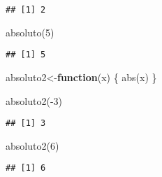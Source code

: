 \documentclass[
]{article}
\newenvironment{Shaded}{\begin{snugshade}}{\end{snugshade}}
\newcommand{\ControlFlowTok}[1]{\textcolor[rgb]{0.13,0.29,0.53}{\textbf{#1}}}
\newcommand{\DecValTok}[1]{\textcolor[rgb]{0.00,0.00,0.81}{#1}}
\newcommand{\FunctionTok}[1]{\textcolor[rgb]{0.00,0.00,0.00}{#1}}
\newcommand{\NormalTok}[1]{#1}
\newcommand{\OtherTok}[1]{\textcolor[rgb]{0.56,0.35,0.01}{#1}}
\newcommand{\SpecialCharTok}[1]{\textcolor[rgb]{0.00,0.00,0.00}{#1}}
\begin{document}
\begin{verbatim}
## [1] 2
\end{verbatim}

\begin{Shaded}
\begin{Highlighting}[]
\FunctionTok{absoluto}\NormalTok{(}\DecValTok{5}\NormalTok{)}
\end{Highlighting}
\end{Shaded}

\begin{verbatim}
## [1] 5
\end{verbatim}

\begin{Shaded}
\begin{Highlighting}[]
\NormalTok{absoluto2}\OtherTok{\textless{}{-}}\ControlFlowTok{function}\NormalTok{(x) \{}
  \FunctionTok{abs}\NormalTok{(x)}
\NormalTok{\}}

\FunctionTok{absoluto2}\NormalTok{(}\SpecialCharTok{{-}}\DecValTok{3}\NormalTok{)}
\end{Highlighting}
\end{Shaded}

\begin{verbatim}
## [1] 3
\end{verbatim}

\begin{Shaded}
\begin{Highlighting}[]
\FunctionTok{absoluto2}\NormalTok{(}\DecValTok{6}\NormalTok{)}
\end{Highlighting}
\end{Shaded}

\begin{verbatim}
## [1] 6
\end{verbatim}
\end{document}

